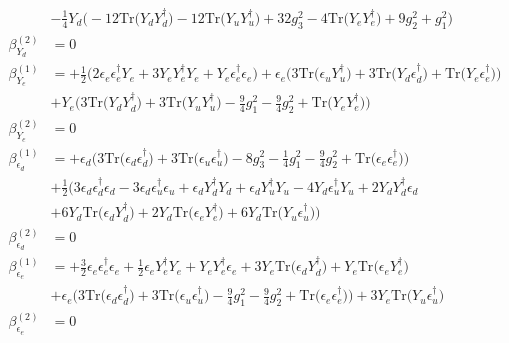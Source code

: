 {\begin{align}
 &-\frac{1}{4} Y_d \Big(-12 \mbox{Tr}\Big({Y_d  Y_{d}^{\dagger}}\Big)  -12 \mbox{Tr}\Big({Y_u  Y_{u}^{\dagger}}\Big)  + 32 g_{3}^{2}  -4 \mbox{Tr}\Big({Y_e  Y_{e}^{\dagger}}\Big)  + 9 g_{2}^{2}  + g_{1}^{2}\Big)\\ 
\beta_{Y_d}^{(2)} & =  
0\\ 
\beta_{Y_e}^{(1)} & =  
+\frac{1}{2} \Big(2 {\epsilon_e  \epsilon_{e}^{\dagger}  Y_e}  + 3 {Y_e  Y_{e}^{\dagger}  Y_e}  + {Y_e  \epsilon_{e}^{\dagger}  \epsilon_e}\Big)+\epsilon_e \Big(3 \mbox{Tr}\Big({\epsilon_u  Y_{u}^{\dagger}}\Big)  + 3 \mbox{Tr}\Big({Y_d  \epsilon_{d}^{\dagger}}\Big)  + \mbox{Tr}\Big({Y_e  \epsilon_{e}^{\dagger}}\Big)\Big)\nonumber \\ 
 &+Y_e \Big(3 \mbox{Tr}\Big({Y_d  Y_{d}^{\dagger}}\Big)  + 3 \mbox{Tr}\Big({Y_u  Y_{u}^{\dagger}}\Big)  -\frac{9}{4} g_{1}^{2}  -\frac{9}{4} g_{2}^{2}  + \mbox{Tr}\Big({Y_e  Y_{e}^{\dagger}}\Big)\Big)\\ 
\beta_{Y_e}^{(2)} & =  
0\\ 
\beta_{\epsilon_d}^{(1)} & =  
+\epsilon_d \Big(3 \mbox{Tr}\Big({\epsilon_d  \epsilon_{d}^{\dagger}}\Big)  + 3 \mbox{Tr}\Big({\epsilon_u  \epsilon_{u}^{\dagger}}\Big)  -8 g_{3}^{2}  -\frac{1}{4} g_{1}^{2}  -\frac{9}{4} g_{2}^{2}  + \mbox{Tr}\Big({\epsilon_e  \epsilon_{e}^{\dagger}}\Big)\Big)\nonumber \\ 
 &+\frac{1}{2} \Big(3 {\epsilon_d  \epsilon_{d}^{\dagger}  \epsilon_d} -3 {\epsilon_d  \epsilon_{u}^{\dagger}  \epsilon_u} +{\epsilon_d  Y_{d}^{\dagger}  Y_d}+{\epsilon_d  Y_{u}^{\dagger}  Y_u}-4 {Y_d  \epsilon_{u}^{\dagger}  Y_u} +2 {Y_d  Y_{d}^{\dagger}  \epsilon_d} \nonumber \\ 
 &+6 Y_d \mbox{Tr}\Big({\epsilon_d  Y_{d}^{\dagger}}\Big) +2 Y_d \mbox{Tr}\Big({\epsilon_e  Y_{e}^{\dagger}}\Big) +6 Y_d \mbox{Tr}\Big({Y_u  \epsilon_{u}^{\dagger}}\Big) \Big)\\ 
\beta_{\epsilon_d}^{(2)} & =  
0\\ 
\beta_{\epsilon_e}^{(1)} & =  
+\frac{3}{2} {\epsilon_e  \epsilon_{e}^{\dagger}  \epsilon_e} +\frac{1}{2} {\epsilon_e  Y_{e}^{\dagger}  Y_e} +{Y_e  Y_{e}^{\dagger}  \epsilon_e}+3 Y_e \mbox{Tr}\Big({\epsilon_d  Y_{d}^{\dagger}}\Big) +Y_e \mbox{Tr}\Big({\epsilon_e  Y_{e}^{\dagger}}\Big) \nonumber \\ 
 &+\epsilon_e \Big(3 \mbox{Tr}\Big({\epsilon_d  \epsilon_{d}^{\dagger}}\Big)  + 3 \mbox{Tr}\Big({\epsilon_u  \epsilon_{u}^{\dagger}}\Big)  -\frac{9}{4} g_{1}^{2}  -\frac{9}{4} g_{2}^{2}  + \mbox{Tr}\Big({\epsilon_e  \epsilon_{e}^{\dagger}}\Big)\Big)+3 Y_e \mbox{Tr}\Big({Y_u  \epsilon_{u}^{\dagger}}\Big) \\ 
\beta_{\epsilon_e}^{(2)} & =  
0
\end{align}} 
